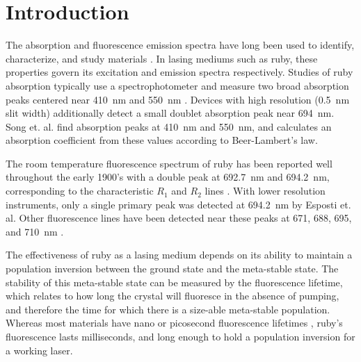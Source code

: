 \documentclass[12pt, a4paper, twocolumn]{article}
\begin{document}

\twocolumn[
  \begin{@twocolumnfalse}
    \maketitle
    \begin{abstract}
      \abstractText
      \newline
      \newline
    \end{abstract}
  \end{@twocolumnfalse}
]


\section{Introduction}
The absorption and fluorescence emission spectra have long been used to identify, characterize, and study materials \cite{BrittanicaSpectroscopy}. In lasing mediums such as ruby, these properties govern its excitation and emission spectra respectively. Studies of ruby absorption typically use a spectrophotometer and measure two broad absorption peaks centered near \SI{410}{\nm} and \SI{550}{\nm} \cite{Esposti,Kusuma,Song}. Devices with high resolution (\SI{0.5}{\nm} slit width) additionally detect a small doublet absorption peak near \SI{694}{\nm}. Song et. al. find absorption peaks at \SI{410}{\nm} and \SI{550}{\nm}, and calculates an absorption coefficient from these values according to Beer-Lambert's law.

The room temperature fluorescence spectrum of ruby has been reported well throughout the early 1900's with a double peak at \SI{692.7}{\nm} and \SI{694.2}{\nm}, corresponding to the characteristic $R_1$ and $R_2$ lines \cite{Kumari, Mani}. With lower resolution instruments, only a single primary peak was detected at \SI{694.2}{\nm} by Esposti et. al. Other fluorescence lines have been detected near these peaks at 671, 688, 695, and \SI{710}{\nm} \cite{Kusuma}.

The effectiveness of ruby as a lasing medium depends on its ability to maintain a population inversion between the ground state and the meta-stable state. The stability of this meta-stable state can be measured by the fluorescence lifetime, which relates to how long the crystal will fluoresce in the absence of pumping, and therefore the time for which there is a size-able meta-stable population. Whereas most materials have nano or picosecond fluorescence lifetimes \cite{Berezin}, ruby’s fluorescence lasts milliseconds, and long enough to hold a population inversion for a working laser.
\end{document}
